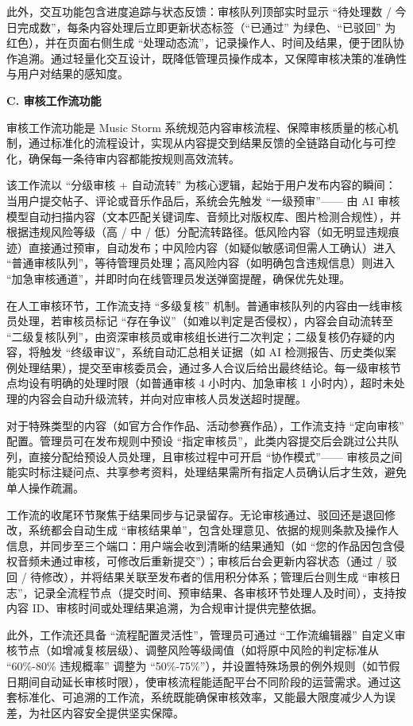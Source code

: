 \documentclass{base}
\numberwithin{figure}{section} %
\begin{document}
此外，交互功能包含进度追踪与状态反馈：审核队列顶部实时显示 “待处理数 / 今日完成数”，每条内容处理后立即更新状态标签（“已通过” 为绿色、“已驳回” 为红色），并在页面右侧生成 “处理动态流”，记录操作人、时间及结果，便于团队协作追溯。通过轻量化交互设计，既降低管理员操作成本，又保障审核决策的准确性与用户对结果的感知度。

\textbf{C. 审核工作流功能}

审核工作流功能是 Music Storm 系统规范内容审核流程、保障审核质量的核心机制，通过标准化的流程设计，实现从内容提交到结果反馈的全链路自动化与可控化，确保每一条待审内容都能按规则高效流转。​

该工作流以 “分级审核 + 自动流转” 为核心逻辑，起始于用户发布内容的瞬间：当用户提交帖子、评论或音乐作品后，系统会先触发 “一级预审”—— 由 AI 审核模型自动扫描内容（文本匹配关键词库、音频比对版权库、图片检测合规性），并根据违规风险等级（高 / 中 / 低）分配流转路径。低风险内容（如无明显违规痕迹）直接通过预审，自动发布；中风险内容（如疑似敏感词但需人工确认）进入 “普通审核队列”，等待管理员处理；高风险内容（如明确包含违规信息）则进入 “加急审核通道”，并即时向在线管理员发送弹窗提醒，确保优先处理。​

在人工审核环节，工作流支持 “多级复核” 机制。普通审核队列的内容由一线审核员处理，若审核员标记 “存在争议”（如难以判定是否侵权），内容会自动流转至 “二级复核队列”，由资深审核员或审核组长进行二次判定；二级复核仍存疑的内容，将触发 “终级审议”，系统自动汇总相关证据（如 AI 检测报告、历史类似案例处理结果），提交至审核委员会，通过多人合议后给出最终结论。每一级审核节点均设有明确的处理时限（如普通审核 4 小时内、加急审核 1 小时内），超时未处理的内容会自动升级流转，并向对应审核人员发送超时提醒。​

对于特殊类型的内容（如官方合作作品、活动参赛作品），工作流支持 “定向审核” 配置。管理员可在发布规则中预设 “指定审核员”，此类内容提交后会跳过公共队列，直接分配给预设人员处理，且审核过程中可开启 “协作模式”—— 审核员之间能实时标注疑问点、共享参考资料，处理结果需所有指定人员确认后才生效，避免单人操作疏漏。​

工作流的收尾环节聚焦于结果同步与记录留存。无论审核通过、驳回还是退回修改，系统都会自动生成 “审核结果单”，包含处理意见、依据的规则条款及操作人信息，并同步至三个端口：用户端会收到清晰的结果通知（如 “您的作品因包含侵权音频未通过审核，可修改后重新提交”）；审核后台会更新内容状态（通过 / 驳回 / 待修改），并将结果关联至发布者的信用积分体系；管理后台则生成 “审核日志”，记录全流程节点（提交时间、预审结果、各审核环节处理人及时间），支持按内容 ID、审核时间或处理结果追溯，为合规审计提供完整依据。

此外，工作流还具备 “流程配置灵活性”，管理员可通过 “工作流编辑器” 自定义审核节点（如增减复核层级）、调整风险等级阈值（如将原中风险的判定标准从 “60\%-80\% 违规概率” 调整为 “50\%-75\%”），并设置特殊场景的例外规则（如节假日期间自动延长审核时限），使审核流程能适配平台不同阶段的运营需求。通过这套标准化、可追溯的工作流，系统既能确保审核效率，又能最大限度减少人为误差，为社区内容安全提供坚实保障。​
\end{document}
